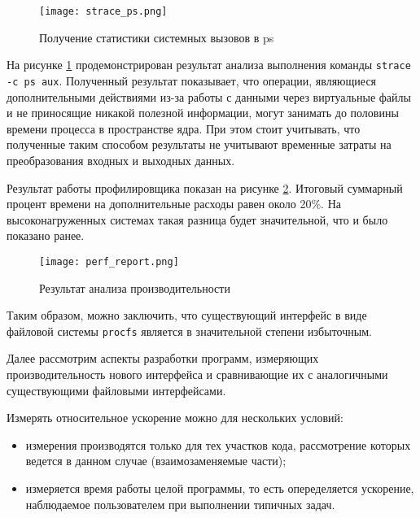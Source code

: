 \begin{figure}
  \centering
  \texttt{[image: strace\_ps.png]}
  \caption{Получение статистики системных вызовов в ps}
  \label{fig:strace_ps}
\end{figure}

На рисунке \ref{fig:strace_ps}
продемонстрирован результат анализа выполнения команды
\texttt{strace -c ps aux}. Полученный результат
показывает, что операции, являющиеся дополнительными действиями из-за работы с
данными через виртуальные файлы и не приносящие никакой полезной информации,
могут занимать до половины времени процесса в пространстве ядра. При этом стоит
учитывать, что полученные таким способом результаты не учитывают временные
затраты на преобразования входных и выходных данных.

Результат работы профилировщика показан на рисунке \ref{fig:perf_report}.
Итоговый суммарный процент времени на дополнительные расходы равен около 20\%.
На высоконагруженных системах такая разница будет значительной, что и было
показано ранее.

\begin{figure}
  \centering
  \texttt{[image: perf\_report.png]}
  \caption{Результат анализа производительности}
  \label{fig:perf_report}
\end{figure}

Таким образом, можно заключить, что существующий интерфейс в виде файловой
системы \texttt{procfs} является в значительной степени избыточным.

Далее рассмотрим аспекты разработки программ, измеряющих производительность
нового интерфейса и сравнивающие их с аналогичными существующими файловыми
интерфейсами.

Измерять относительное ускорение можно для нескольких условий:
\begin{itemize}
\item измерения производятся только для тех участков кода, рассмотрение которых
  ведется в данном случае (взаимозаменяемые части);
\item измеряется время работы целой программы, то есть опеределяется ускорение,
  наблюдаемое пользователем при выполнении типичных задач.
\end{itemize}

